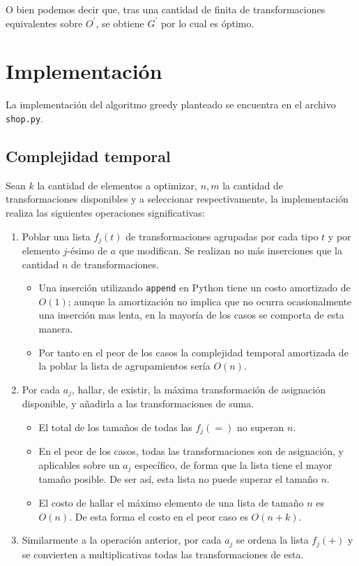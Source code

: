 \documentclass{article}
\theoremstyle{default}
\begin{document}
	O bien podemos decir que, tras una cantidad de finita de transformaciones equivalentes sobre $O^\prime$, se obtiene $G^\prime$ por lo cual es óptimo.
%
%
%
\section{Implementación}
La implementación del algoritmo greedy planteado se encuentra en el archivo \texttt{shop.py}.
%
\subsection{Complejidad temporal}
	Sean $k$ la cantidad de elementos a optimizar, $n, m$ la cantidad de transformaciones disponibles y a seleccionar respectivamente, la implementación realiza las siguientes operaciones significativas:
	\begin{enumerate}
		\item Poblar una lista $f_j(t)$ de transformaciones agrupadas por cada tipo $t$ y por elemento $j$-ésimo de $a$ que modifican. Se realizan no más inserciones que la cantidad $n$ de transformaciones.
		\begin{itemize}
			\item Una inserción utilizando \texttt{append} en Python tiene un costo amortizado de $O(1)$; aunque la amortización no implica que no ocurra ocasionalmente una inserción mas lenta, en la mayoría de los casos se comporta de esta manera.
			\item Por tanto en el peor de los casos la complejidad temporal amortizada de la poblar la lista de agrupamientos sería $O(n)$.
		\end{itemize}
%
		\item Por cada $a_j$, hallar, de existir, la máxima transformación de asignación disponible, y añadirla a las transformaciones de suma.
		\begin{itemize}
			\item El total de los tamaños de todas las $f_j(=)$ no superan $n$.
			\item En el peor de los casos, todas las transformaciones son de asignación, y aplicables sobre un $a_j$ específico, de forma que la lista tiene el mayor tamaño posible. De ser así, esta lista no puede superar el tamaño $n$.
			\item El costo de hallar el máximo elemento de una lista de tamaño $n$ es $O(n)$. De esta forma el costo en el peor caso es $O(n + k)$.
		\end{itemize}
%
		\item Similarmente a la operación anterior, por cada $a_j$ se ordena la lista $f_j(+)$ y se convierten a multiplicativas todas las transformaciones de esta.

\end{enumerate}
\end{document}
